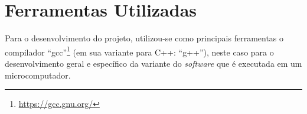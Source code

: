 %
%
%
%
%

%
%
%
%
%

\section{Ferramentas Utilizadas} \label{sec:tools}

Para o desenvolvimento do projeto, utilizou-se como principais ferramentas o compilador ``gcc''\footnote{\href{https://gcc.gnu.org/}{https://gcc.gnu.org/}} (em sua variante para C++: ``g++''), neste caso para o desenvolvimento geral e específico da variante do \textit{software} que é executada em um microcomputador.

